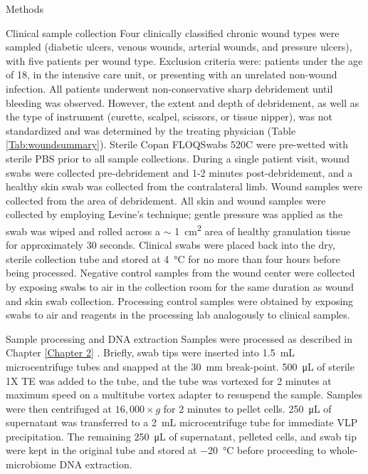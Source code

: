 \documentclass[oneside,12pt,final]{sty/ucthesis-CA2012}
\begin{document}
\begin{mainmatter}
\begin{section}{Methods}
\begin{subsection}{Clinical sample collection}
Four clinically classified chronic wound types were sampled (diabetic ulcers, venous wounds, arterial wounds, and pressure ulcers), with five patients per wound type. Exclusion criteria were: patients under the age of 18, in the intensive care unit, or presenting with an unrelated non-wound infection. All patients underwent non-conservative sharp debridement until bleeding was observed. However, the extent and depth of debridement, as well as the type of instrument (curette, scalpel, scissors, or tissue nipper), was not standardized and was determined by the treating physician (Table \ref{Tab:woundsummary}). Sterile Copan FLOQSwabs 520C were pre-wetted with sterile PBS prior to all sample collections. During a single patient visit, wound swabs were collected pre-debridement and 1-2 minutes post-debridement, and a healthy skin swab was collected from the contralateral limb. Wound samples were collected from the area of debridement. All skin and wound samples were collected by employing Levine’s technique; gentle pressure was applied as the swab was wiped and rolled across a $\sim$ \SI{1}{\centi\meter\squared} area of healthy granulation tissue for approximately 30 seconds. Clinical swabs were placed back into the dry, sterile collection tube and stored at \SI{4}{\celsius} for no more than four hours before being processed. Negative control samples from the wound center were collected by exposing swabs to air in the collection room for the same duration as wound and skin swab collection. Processing control samples were obtained by exposing swabs to air and reagents in the processing lab analogously to clinical samples.
\end{subsection}

\begin{subsection}{Sample processing and DNA extraction}
Samples were processed as described in Chapter \ref{Chapter 2} \cite{RN41}. Briefly, swab tips were inserted into \SI{1.5}{\milli\liter} microcentrifuge tubes and snapped at the \SI{30}{\milli\meter} break-point. \SI{500}{\micro\liter} of sterile 1X TE was added to the tube, and the tube was vortexed for 2 minutes at maximum speed on a multitube vortex adapter to resuspend the sample. Samples were then centrifuged at $16,000 \times g$ for 2 minutes to pellet cells. \SI{250}{\micro\liter} of supernatant was transferred to a \SI{2}{\mL} microcentrifuge tube for immediate VLP precipitation. The remaining \SI{250}{\micro\liter} of supernatant, pelleted cells, and swab tip were kept in the original tube and stored at \SI{-20}{\celsius} before proceeding to whole-microbiome DNA extraction.
\end{subsection}


\end{section}
\end{mainmatter}
\end{document}
